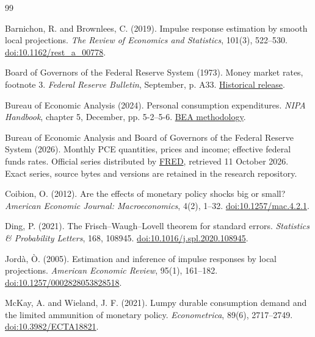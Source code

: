 \documentclass[11pt,a4paper]{article}
\begin{document}
\begin{thebibliography}{99}
\small
\setlength{\bibsep}{4pt}

Barnichon, R. and Brownlees, C. (2019). Impulse response estimation by smooth local projections. \emph{The Review of Economics and Statistics}, 101(3), 522--530. \href{https://doi.org/10.1162/rest_a_00778}{doi:10.1162/rest\_a\_00778}.

Board of Governors of the Federal Reserve System (1973). Money market rates, footnote 3. \emph{Federal Reserve Bulletin}, September, p. A33. \href{https://fraser.stlouisfed.org/title/federal-reserve-bulletin-62/september-1973-21466/fulltext}{Historical release}.

Bureau of Economic Analysis (2024). Personal consumption expenditures. \emph{NIPA Handbook}, chapter 5, December, pp. 5-2--5-6. \href{https://www.bea.gov/resources/methodologies/nipa-handbook/pdf/chapter-05.pdf}{BEA methodology}.

Bureau of Economic Analysis and Board of Governors of the Federal Reserve System (2026). Monthly PCE quantities, prices and income; effective federal funds rates. Official series distributed by \href{https://fred.stlouisfed.org/}{FRED}, retrieved 11 October 2026. Exact series, source bytes and versions are retained in the research repository.

Coibion, O. (2012). Are the effects of monetary policy shocks big or small? \emph{American Economic Journal: Macroeconomics}, 4(2), 1--32. \href{https://doi.org/10.1257/mac.4.2.1}{doi:10.1257/mac.4.2.1}.

Ding, P. (2021). The Frisch--Waugh--Lovell theorem for standard errors. \emph{Statistics \& Probability Letters}, 168, 108945. \href{https://doi.org/10.1016/j.spl.2020.108945}{doi:10.1016/j.spl.2020.108945}.

Jord\`a, \`O. (2005). Estimation and inference of impulse responses by local projections. \emph{American Economic Review}, 95(1), 161--182. \href{https://doi.org/10.1257/0002828053828518}{doi:10.1257/0002828053828518}.

McKay, A. and Wieland, J. F. (2021). Lumpy durable consumption demand and the limited ammunition of monetary policy. \emph{Econometrica}, 89(6), 2717--2749. \href{https://doi.org/10.3982/ECTA18821}{doi:10.3982/ECTA18821}.


\end{thebibliography}
\end{document}
